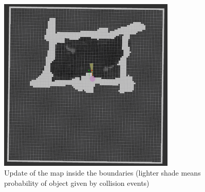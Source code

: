 \begin{figure}[!ht]
	\begin{center}
		\includegraphics[width=0.75\textwidth]{Images/5-Results/CollisionMap.png}
	\end{center}
	\caption{Update of the map inside the boundaries (lighter shade means probability of object given by collision events)}
	\label{fig:occGridUpdate}
\end{figure}




\cleardoublepage
